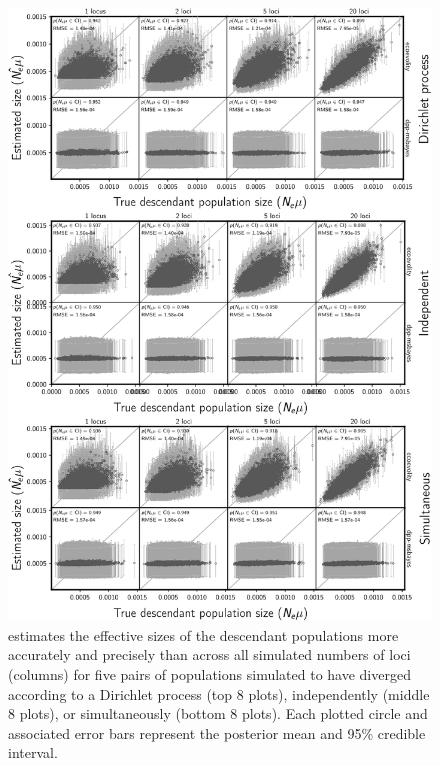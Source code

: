 \clearpage

\begin{figure}[htbp]
    \begin{center}
        \includegraphics[width=\textwidth,height=0.9\textheight,keepaspectratio]{../images/from-project-repo/plots/tex-plot-grids/grid-leaf-pop-size-scatter-cropped.pdf}
        \caption{
            \scriptsize
            \Ecoevolity estimates the effective sizes of the
            descendant populations more accurately and precisely than
            \dppmsbayes across all simulated numbers of loci
            (columns) for five pairs of populations simulated to have diverged
            according to a Dirichlet process (top 8 plots),
            independently (middle 8 plots),
            or simultaneously (bottom 8 plots).
            Each plotted circle and associated error bars represent the posterior mean
            and 95\% credible interval.
            \accuracyscatterplotannotations{\epopsize{}}
        }
        \label{fig:leafpopsizescatter}
    \end{center}
\end{figure}

